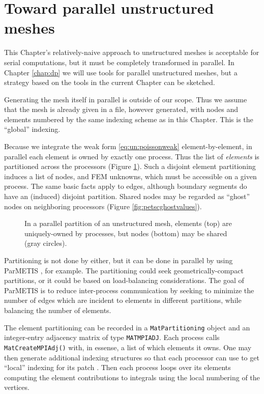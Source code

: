 \section{Toward parallel unstructured meshes}

This Chapter's relatively-naive approach to unstructured meshes is acceptable for serial computations, but it must be completely transformed in parallel.  In Chapter \ref{chap:dp} we will use \PETSc tools for parallel unstructured meshes, but a strategy based on the tools in the current Chapter can be sketched.

Generating the mesh itself in parallel is outside of our scope.  Thus we assume that the mesh is already given in a file, however generated, with nodes and elements numbered by the same indexing scheme as in this Chapter.  This is the ``global'' indexing.

Because we integrate the weak form \eqref{eq:un:poissonweak} element-by-element, in parallel each element is owned by exactly one process.  Thus the list of \emph{elements} is partitioned across the processors (Figure \ref{fig:un:parallelunstructured}).  Such a disjoint element partitioning induces a list of nodes, and FEM unknowns, which must be accessible on a given process.  The same basic facts apply to edges, although boundary segments do have an (induced) disjoint partition.  Shared nodes may be regarded as ``ghost'' nodes on neighboring processors (Figure \ref{fig:petscghostvalues}).

\begin{figure}

\caption{In a parallel partition of an unstructured mesh, elements (top) are uniquely-owned by processes, but nodes (bottom) may be shared (gray circles).}
\label{fig:un:parallelunstructured}
\end{figure}

Partitioning is not done by \PETSc either, but it can be done in parallel by using ParMETIS \citep{KarypisKumar1999}, for example.  The partitioning could seek geometrically-compact partitions, or it could be based on load-balancing considerations.  The goal of ParMETIS is to reduce inter-process communication by seeking to minimize the number of edges which are incident to elements in different partitions, while balancing the number of elements.

The element partitioning can be recorded in a \texttt{MatPartitioning} object and an integer-entry adjacency matrix of type \texttt{MATMPIADJ}.  Each process calls \texttt{MatCreateMPIAdj()} with, in essense, a list of which elements it owns.  One may then generate additional indexing structures so that each processor can use to get ``local'' indexing for its patch \citep{petsc-user-ref}.  Then each process loops over its elements computing the element contributions to integrals using the local numbering of the vertices.

